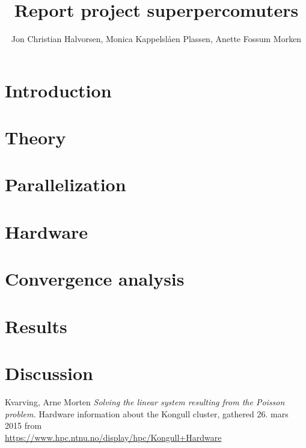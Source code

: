 \documentclass[10pt, a4paper]{article} %
\title{Report project superpercomuters}
\author[]{Jon Christian Halvorsen, Monica Kappelslåen Plassen, Anette Fossum Morken}
\date{}
\begin{document}
\maketitle
{}

\section*{Introduction}


\section*{Theory}


\section*{Parallelization}

 
\section*{Hardware}
 
 
\section*{Convergence analysis}


\section*{Results}


\section*{Discussion}



\begin{thebibliography}{10}
 Kvarving, Arne Morten \emph{Solving the linear system resulting from the Poisson problem.}
 Hardware information about the Kongull cluster, gathered 26. mars 2015 from \\ \url{https://www.hpc.ntnu.no/display/hpc/Kongull+Hardware}
\end{thebibliography}
\end{document}
